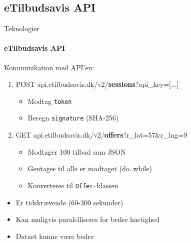 		\subsection{eTilbudsavis API}
			\begin{frame}[t]{Teknologier} \framesubtitle{eTilbudsavis API}
			Kommunikation med API'en:
				\begin{enumerate}
					\item<1> POST api.etilbudsavis.dk/v2/\textbf{sessions}?api\_key=[...]
					\begin{itemize}
						\item<1> Modtag \texttt{token}
						\item<1> Beregn \texttt{signature} (SHA-256)
					\end{itemize}
					\item<2> GET api.etilbudsavis.dk/v2/\textbf{offers}?r\_lat=57\&r\_lng=9
					\begin{itemize}
						\item<2> Modtager 100 tilbud som JSON
						\item<2> Gentages til alle er modtaget (do..while)
						\item<2> Konverteres til \texttt{Offer}--klassen
					\end{itemize}
				\end{enumerate}
				\begin{itemize}
					\item<3> Er tidskrævende (60-300 sekunder)
					\item<3> Kan muligvis paralelliseres for bedre hastighed
					\item<3> Dataet kunne være bedre
				\end{itemize}
			\end{frame}